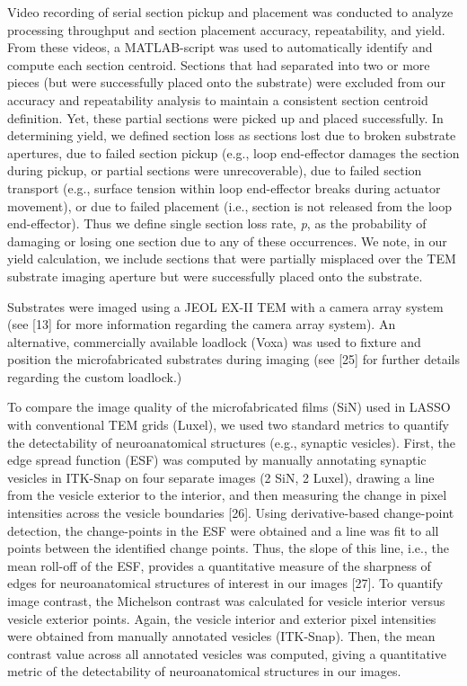 \documentclass{article}
\begin{document}
Video recording of serial section pickup and placement was conducted to analyze processing throughput and section placement accuracy, repeatability, and yield. From these videos, a MATLAB-script was used to automatically identify and compute each section centroid. Sections that had separated into two or more pieces (but were successfully placed onto the substrate) were excluded from our accuracy and repeatability analysis to maintain a consistent section centroid definition. Yet, these partial sections were picked up and placed successfully. In determining yield, we defined section loss as sections lost due to broken substrate apertures, due to failed section pickup (e.g., loop end-effector damages the section during pickup, or partial sections were unrecoverable), due to failed section transport (e.g., surface tension within loop end-effector breaks during actuator movement), or due to failed placement (i.e., section is not released from the loop end-effector). Thus we define single section loss rate, \emph{p}, as the probability of damaging or losing one section due to any of these occurrences. We note, in our yield calculation, we include sections that were partially misplaced over the TEM substrate imaging aperture but were successfully placed onto the substrate.

Substrates were imaged using a JEOL EX-II TEM with a camera array system (see [13] for more information regarding the camera array system). An alternative, commercially available loadlock (Voxa) was used to fixture and position the microfabricated substrates during imaging (see [25] for further details regarding the custom loadlock.)

To compare the image quality of the microfabricated films (SiN) used in LASSO with conventional TEM grids (Luxel), we used two standard metrics to quantify the detectability of neuroanatomical structures (e.g., synaptic vesicles). First, the edge spread function (ESF) was computed by manually annotating synaptic vesicles in ITK-Snap on four separate images (2 SiN, 2 Luxel), drawing a line from the vesicle exterior to the interior, and then measuring the change in pixel intensities across the vesicle boundaries [26]. Using derivative-based change-point detection, the change-points in the ESF were obtained and a line was fit to all points between the identified change points. Thus, the slope of this line, i.e., the mean roll-off of the ESF, provides a quantitative measure of the sharpness of edges for neuroanatomical structures of interest in our images [27]. To quantify image contrast, the Michelson contrast was calculated for vesicle interior versus vesicle exterior points. Again, the vesicle interior and exterior pixel intensities were obtained from manually annotated vesicles (ITK-Snap). Then, the mean contrast value across all annotated vesicles was computed, giving a quantitative metric of the detectability of neuroanatomical structures in our images.
\end{document}
